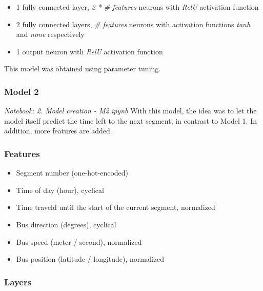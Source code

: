 \begin{itemize}
    \item 1 fully connected layer, \textit{2 * \# features} neurons with \textit{RelU} activation function
    \item 2 fully connected layers, \textit{\# features} neurons with activation functions \textit{tanh} and \textit{none} respectively
    \item 1 output neuron with \textit{RelU} activation function
\end{itemize}

This model was obtained using parameter tuning.


\subsubsection{Model 2}\label{M2}
\textit{Notebook: 2. Model creation - M2.ipynb}
\newline
\noindent With this model, the idea was to let the model itself predict the time left to the next segment, in contrast to Model 1. In addition, more features are added.

\subsubsection{Features}

\begin{itemize}
    \item Segment number (one-hot-encoded)
    \item Time of day (hour), cyclical
    \item Time traveld until the start of the current segment, normalized
    \item Bus direction (degrees), cyclical
    \item Bus speed (meter / second), normalized
    \item Bus position (latitude / longitude), normalized
\end{itemize}
  

\subsubsection{Layers}

